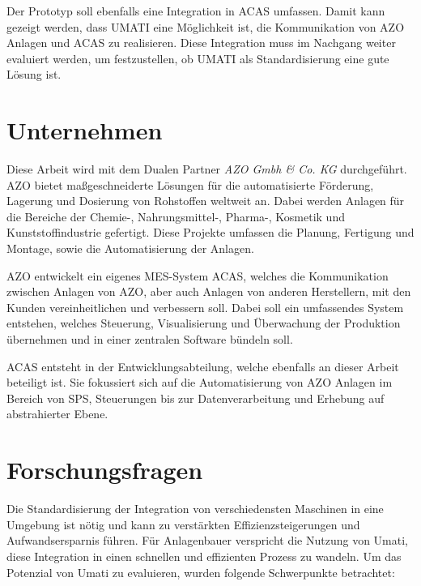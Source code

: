 \documentclass[a4paper, 12pt, oneside]{scrbook}
\begin{document}
	 Der Prototyp soll ebenfalls eine Integration in ACAS umfassen. Damit kann gezeigt werden, dass UMATI eine Möglichkeit ist, die Kommunikation von AZO Anlagen und ACAS zu realisieren. Diese Integration muss im Nachgang weiter evaluiert werden, um festzustellen, ob UMATI als Standardisierung eine gute Lösung ist.
	
	
	\section{Unternehmen}
	
	  Diese Arbeit wird mit dem Dualen Partner \textit{AZO Gmbh \& Co. KG} durchgeführt. AZO bietet maßgeschneiderte Lösungen für die automatisierte Förderung, Lagerung und Dosierung von Rohstoffen weltweit an. Dabei werden Anlagen für die Bereiche der Chemie-, Nahrungsmittel-, Pharma-, Kosmetik und Kunststoffindustrie gefertigt. Diese Projekte umfassen die Planung, Fertigung und Montage, sowie die Automatisierung der Anlagen.
	 
	 AZO entwickelt ein eigenes MES-System ACAS, welches die Kommunikation zwischen Anlagen von AZO, aber auch Anlagen von anderen Herstellern, mit den Kunden vereinheitlichen und verbessern soll. Dabei soll ein umfassendes System entstehen, welches Steuerung, Visualisierung und Überwachung der Produktion übernehmen und in einer zentralen Software bündeln soll.
	 
	 ACAS entsteht in der Entwicklungsabteilung, welche ebenfalls an dieser Arbeit beteiligt ist. Sie fokussiert sich auf die Automatisierung von AZO Anlagen im Bereich von SPS, Steuerungen bis zur Datenverarbeitung und Erhebung auf abstrahierter Ebene. 
	
	
	\section{Forschungsfragen}
	
	Die Standardisierung der Integration von verschiedensten Maschinen in eine Umgebung ist nötig und kann zu verstärkten Effizienzsteigerungen und Aufwandsersparnis führen. Für Anlagenbauer verspricht die Nutzung von Umati, diese Integration in einen schnellen und effizienten Prozess zu wandeln. Um das Potenzial von Umati zu evaluieren, wurden folgende Schwerpunkte betrachtet:
	
\end{document}
